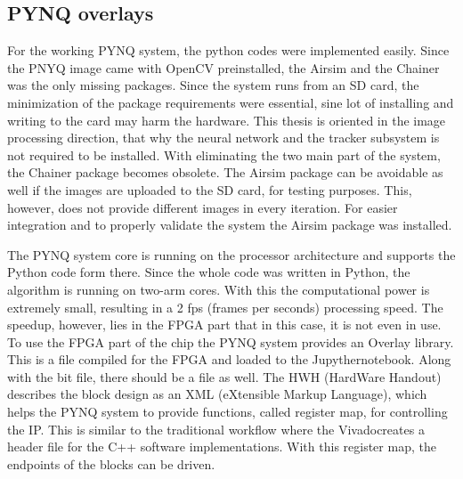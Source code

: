 \subsection{PYNQ overlays} %
For the working PYNQ system, the python codes were implemented easily.
Since the PNYQ image came with OpenCV preinstalled, the Airsim and the Chainer was the only missing packages.
Since the system runs from an SD card, the minimization of the package requirements were essential, sine lot of installing and writing to the card may harm the hardware.
This thesis is oriented in the image processing direction, that why the neural network and the tracker subsystem is not required to be installed.
With eliminating the two main part of the system, the Chainer package becomes obsolete.
The Airsim package can be avoidable as well if the images are uploaded to the SD card, for testing purposes.
This, however, does not provide different images in every iteration.
For easier integration and to properly validate the system the Airsim package was installed.

The PYNQ system core is running on the processor architecture and supports the Python code form there.
Since the whole code was written in Python, the algorithm is running on two-arm cores.
With this the computational power is extremely small, resulting in a 2 fps (frames per seconds) processing speed.
The speedup, however, lies in the FPGA part that in this case, it is not even in use.
To use the FPGA part of the chip the PYNQ system provides an Overlay library.
This is a  file compiled for the FPGA and loaded to the Jupyther\texttrademark notebook.
Along with the bit file, there should be a  file as well.
The HWH (HardWare Handout) describes the block design as an XML (eXtensible Markup Language), which helps the PYNQ system to provide functions, called register map, for controlling the IP.
This is similar to the traditional workflow where the Vivado\texttrademark creates a header file for the C++ software implementations.
With this register map, the endpoints of the blocks can be driven.

